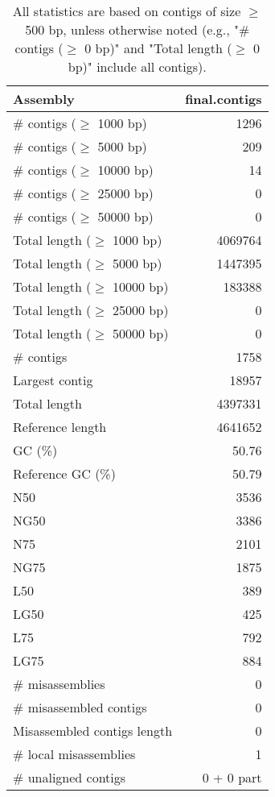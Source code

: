 \documentclass[12pt,a4paper]{article}
\begin{document}
\begin{table}[ht]
\begin{center}
\caption{All statistics are based on contigs of size $\geq$ 500 bp, unless otherwise noted (e.g., "\# contigs ($\geq$ 0 bp)" and "Total length ($\geq$ 0 bp)" include all contigs).}
\begin{tabular}{|l*{1}{|r}|}
\hline
Assembly & final.contigs \\ \hline
\# contigs ($\geq$ 1000 bp) & 1296 \\ \hline
\# contigs ($\geq$ 5000 bp) & 209 \\ \hline
\# contigs ($\geq$ 10000 bp) & 14 \\ \hline
\# contigs ($\geq$ 25000 bp) & 0 \\ \hline
\# contigs ($\geq$ 50000 bp) & 0 \\ \hline
Total length ($\geq$ 1000 bp) & 4069764 \\ \hline
Total length ($\geq$ 5000 bp) & 1447395 \\ \hline
Total length ($\geq$ 10000 bp) & 183388 \\ \hline
Total length ($\geq$ 25000 bp) & 0 \\ \hline
Total length ($\geq$ 50000 bp) & 0 \\ \hline
\# contigs & 1758 \\ \hline
Largest contig & 18957 \\ \hline
Total length & 4397331 \\ \hline
Reference length & 4641652 \\ \hline
GC (\%) & 50.76 \\ \hline
Reference GC (\%) & 50.79 \\ \hline
N50 & 3536 \\ \hline
NG50 & 3386 \\ \hline
N75 & 2101 \\ \hline
NG75 & 1875 \\ \hline
L50 & 389 \\ \hline
LG50 & 425 \\ \hline
L75 & 792 \\ \hline
LG75 & 884 \\ \hline
\# misassemblies & 0 \\ \hline
\# misassembled contigs & 0 \\ \hline
Misassembled contigs length & 0 \\ \hline
\# local misassemblies & 1 \\ \hline
\# unaligned contigs & 0 + 0 part \\ \hline

\end{tabular}
\end{center}
\end{table}
\end{document}

